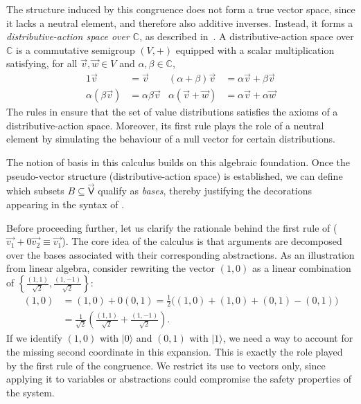\documentclass[runningheads,orivec,envcountsame,envcountsect]{llncs}
\newcommand\braces[1]{\left\{#1\right\}}
\newcommand\ket[1]{\ensuremath{|#1\rangle}}
\newcommand\s[1]{\ensuremath{\mathsf{#1}}}
\newcommand\ValD{\vec{\s V}}
\def\C{\mathbb{C}}            %
\begin{document}
The structure induced by this congruence does not form a true vector space,
since it lacks a neutral element, and therefore also additive inverses.
Instead, it forms a \emph{distributive-action space over $\C$}, as described
in~\cite{DiazCaroMalherbe2022}. A distributive-action space over $\C$ is
a commutative semigroup $(V,+)$ equipped with a scalar multiplication
satisfying, for all $\vec v,\vec w\in V$ and $\alpha,\beta\in \C$,
\begin{align*}
  1\vec{v} &= \vec{v} & (\alpha + \beta)\vec{v} &= \alpha\vec{v} + \beta\vec{v}\\
  \alpha(\beta\vec{v}) &= \alpha\beta\vec{v} & \alpha(\vec{v} + \vec{w}) &= \alpha\vec{v} + \alpha\vec{w}
\end{align*}
The rules in  ensure that the set of value distributions
satisfies the axioms of a distributive-action space. Moreover, its first rule
plays the role of a neutral element by simulating the behaviour of a null
vector for certain distributions.

The notion of basis in this calculus builds on this algebraic foundation. Once
the pseudo-vector structure (distributive-action space) is established, we can
define which subsets $B\subseteq \ValD$ qualify as \emph{bases}, thereby
justifying the decorations appearing in the syntax of
.


Before proceeding further, let us clarify the rationale behind the first rule
of  ($\vec{v_1} + 0\vec{v_2}
\equiv \vec{v_1}$). The core idea of the calculus is that arguments are
decomposed over the bases associated with their corresponding abstractions. As
an illustration from linear algebra, consider rewriting the vector $(1,0)$ as a
linear combination of $\braces{\frac{(1,1)}{\sqrt{2}},
\frac{(1,-1)}{\sqrt{2}}}$:
\begin{align*}
  (1,0) &= (1,0) + 0(0,1) 
        = \tfrac{1}{2}\big((1,0) + (1,0) + (0,1) - (0,1)\big)\\
        &= \tfrac{1}{\sqrt{2}}\!\left(\tfrac{(1,1)}{\sqrt{2}} +
          \tfrac{(1,-1)}{\sqrt{2}}\right).
\end{align*}
If we identify $(1,0)$ with $\ket{0}$ and $(0,1)$ with $\ket{1}$, we need a way
to account for the missing second coordinate in this expansion. This is exactly
the role played by the first rule of the congruence. We restrict its use to
vectors only, since applying it to variables or abstractions could compromise
the safety properties of the system.
\end{document}
